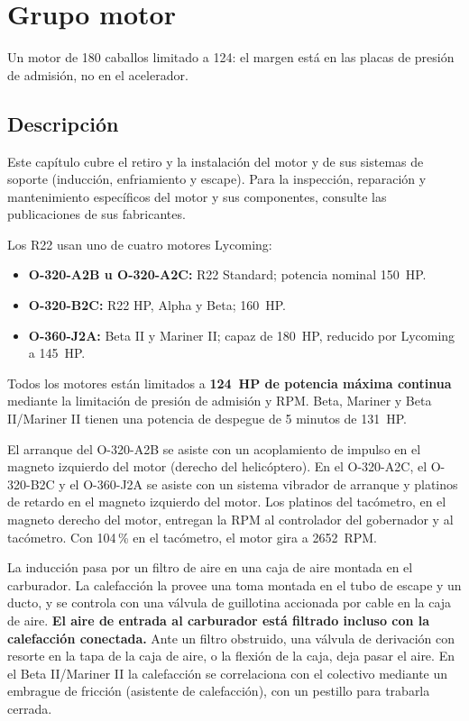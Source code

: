 \chapter{Grupo motor}
\label{cap:mm-motor}

\opening{Un motor de 180 caballos limitado a 124: el margen está en las placas de presión de admisión, no en el acelerador.}

\section{Descripción}

Este capítulo cubre el retiro y la instalación del motor y de sus sistemas de soporte (inducción, enfriamiento y escape). Para la inspección, reparación y mantenimiento específicos del motor y sus componentes, consulte las publicaciones de sus fabricantes.

Los R22 usan uno de cuatro motores Lycoming:

\begin{itemize}
\item \textbf{O-320-A2B u O-320-A2C:} R22 Standard; potencia nominal 150~HP.
\item \textbf{O-320-B2C:} R22 HP, Alpha y Beta; 160~HP.
\item \textbf{O-360-J2A:} Beta II y Mariner II; capaz de 180~HP, reducido por Lycoming a 145~HP.
\end{itemize}

Todos los motores están limitados a \textbf{124~HP de potencia máxima continua} mediante la limitación de presión de admisión y RPM. Beta, Mariner y Beta II/Mariner II tienen una potencia de despegue de 5 minutos de 131~HP.

El arranque del O-320-A2B se asiste con un acoplamiento de impulso en el magneto izquierdo del motor (derecho del helicóptero). En el O-320-A2C, el O-320-B2C y el O-360-J2A se asiste con un sistema vibrador de arranque y platinos de retardo en el magneto izquierdo del motor. Los platinos del tacómetro, en el magneto derecho del motor, entregan la RPM al controlador del gobernador y al tacómetro. Con 104\,\% en el tacómetro, el motor gira a 2652~RPM.

La inducción pasa por un filtro de aire en una caja de aire montada en el carburador. La calefacción la provee una toma montada en el tubo de escape y un ducto, y se controla con una válvula de guillotina accionada por cable en la caja de aire. \textbf{El aire de entrada al carburador está filtrado incluso con la calefacción conectada.} Ante un filtro obstruido, una válvula de derivación con resorte en la tapa de la caja de aire, o la flexión de la caja, deja pasar el aire. En el Beta II/Mariner II la calefacción se correlaciona con el colectivo mediante un embrague de fricción (asistente de calefacción), con un pestillo para trabarla cerrada.

